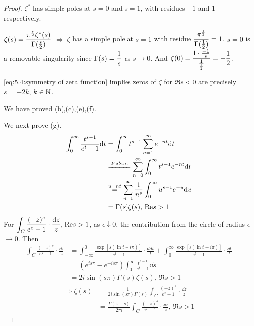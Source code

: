 \begin{proof}
    $ \zeta^* $ has simple poles at  $ s=0 $ and  $ s=1 $, with residues  $ -1 $ and  $ 1 $ respectively.
    
    $ \zeta(s)=\displaystyle\frac{\pi^{\frac{s}{2}}\zeta^*(s)}{\Gamma(\frac{s}{2})} $ $ \Rightarrow  $  $ \zeta  $ has a simple pole at  $ s=1 $ with residue  $ \displaystyle\frac{\pi^{\frac{1}{2}}}{\Gamma(\frac{1}{2})}=1 $.  $ s=0 $ is a removable singularity since  $ \Gamma(s)=\displaystyle\frac{1}{s} $ as  $ s\rightarrow 0 $. And  $ \zeta(0)=\displaystyle\frac{1\cdot\frac{-1}{s}}{\frac{1}{\frac{s}{2}}}=-\frac{1}{2} $.   
    
    \eqref{eq:5.4:symmetry of zeta function} implies zeros of  $ \zeta $ for  $ \Re s<0 $ are precisely  $ s=-2k $,  $ k\in \mathbb N $.
    
    We have proved (b),(c),(e),(f).

    We next prove (g).
    \begin{align*}
        \int_0^\infty\frac{t^{s-1}}{e^t-1}\dd t&=\int_0^\infty t^{s-1}\sum_{n=1}^\infty e^{-nt}\dd t\\
        &\xlongequal{{Fubini}}\sum_{n=0}^\infty\int_0^\infty t^{s-1}e^{-nt}\dd t\\
        &\overset{u=nt }{=}\sum_{n=1}^\infty\frac{1}{n^s}\int_0^\infty u^{s-1}e^{-u}\dd u\\
        &=\Gamma(s)\zeta(s),\,\Re s>1
    \end{align*}
    For  $ \displaystyle\int_C\frac{(-z)^s}{e^z-1}\cdot\frac{\mathrm{d} z}{z},\,\mathrm{Re} s>1 $, as  $ \epsilon\downarrow 0 $, the contribution from the  circle of radius  $ \epsilon $ $ \rightarrow 0 $.  Then 
    \begin{align*}
        \int_C\frac{(-z)^s}{e^z-1}\cdot\frac{\dd z}{z}&=\int_{-\infty}^0\frac{\exp[s(\ln t-i\pi)]}{e^t-1}\cdot\frac{dd t}{t}+\int_0^\infty \frac{\exp[s(\ln t+i\pi)]}{e^t-1}\cdot\frac{\dd t}{t}\\
        &=(e^{is\pi}-e^{-is\pi})\int_0^\infty\frac{t^{s-1}}{e^t-1}\dd s\\
        &=2i\sin(s\pi)\Gamma(s)\zeta(s),\,\Re s>1
    \end{align*}  
    \begin{equation}\label{eq:5.4:another expandation of zeta function}
        \begin{aligned}
            \Rightarrow \zeta(s)&=\frac{1}{2i\sin(s\pi)\Gamma(s)}\int_C\frac{(-z)^s}{e^z-1}\cdot\frac{\dd z}{z}\\
            &=\frac{\Gamma(z-s)}{2\pi i}\int_C\frac{(-z)^s}{e^z-1}\cdot\frac{\dd z}{z},\,\Re s>1
        \end{aligned}  
    \end{equation}


\end{proof}
